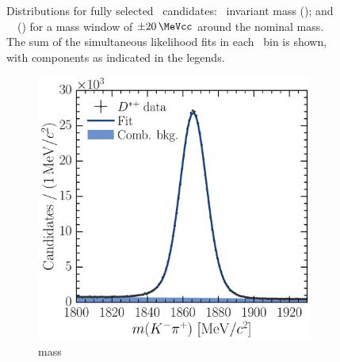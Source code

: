 \begin{figure}
\begin{subfigure}[b]{0.5\textwidth}
    \caption{\lnipchisq}
    \label{fig:prod:fitting:DsToKKpi:ipchisq}
  \end{subfigure}
  \caption{%
    Distributions for fully selected \DspTophipi\ candidates: \PDsplus\ 
    invariant mass (); and \PDsplus\ 
    \lnipchisq\ () for a mass 
    window of $\pm\SI{20}{\MeVcc}$ around the nominal \PDsplus mass.
    The sum of the simultaneous likelihood fits in each \pTy\ bin is shown, 
    with components as indicated in the legends.
  }
  \label{fig:prod:fitting:DsToKKpi}
\end{figure}

\begin{figure}
  \begin{subfigure}[b]{0.5\textwidth}
    \centering
    \includegraphics[width=\textwidth]{figures/production/fitting/DstToD0pi_D0ToKpi_mass_fit_pT_integrated_y_integrated}
    \caption{\PDzero mass}
    \label{fig:prod:fitting:DstToD0pi_D0ToKpi:mass}
  \end{subfigure}
  \begin{subfigure}[b]{0.5\textwidth}
    \centering

\end{subfigure}
\end{figure}
